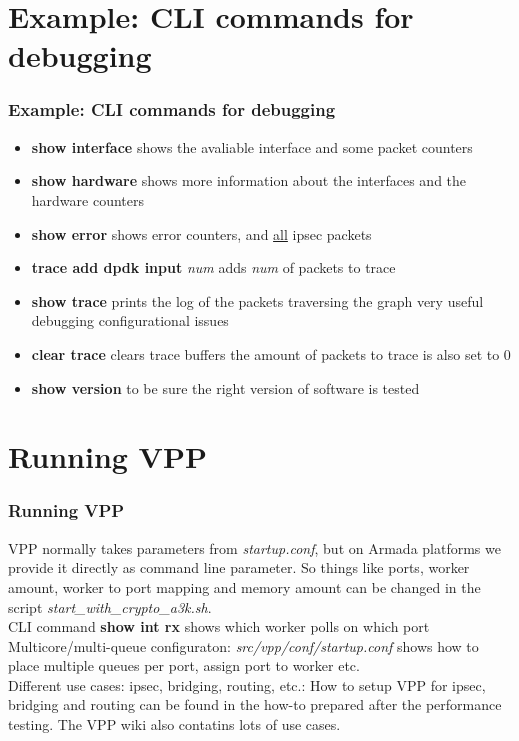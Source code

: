 \documentclass{beamer}
\begin{document}
\section{Example: CLI commands for debugging}
  \begin{frame}
  \frametitle{Example: CLI commands for debugging}
  \begin{itemize}
  \item \textbf{show interface} shows the avaliable interface and some packet counters
  \item \textbf{show hardware} shows more information about the interfaces and the hardware counters
  \item \textbf{show error} shows error counters, and \underline{all} ipsec packets
  \item \textbf{trace add dpdk input} \textit{num} adds \textit{num} of packets to trace
  \item \textbf{show trace} prints the log of the packets traversing the graph 
          {\tiny very useful debugging configurational issues}
  \item \textbf{clear trace} clears trace buffers {\tiny the amount of packets to trace is also set to 0}
  \item \textbf{show version} to be sure the right version of software is tested
  \end{itemize}
  \end{frame}

\section{Running VPP}
  \begin{frame}
  \frametitle{Running VPP}
  VPP normally takes parameters from \textit{startup.conf}, but on Armada platforms we
  provide it directly as command line parameter. So things like
  ports, worker amount, worker to port mapping and memory amount 
  can be changed in the script
  \textit{start\_with\_crypto\_a3k.sh}. \\
  CLI command \textbf{show int rx} shows which worker polls on which port
  \vfill
  {\tiny \color{blue} Multicore/multi-queue configuraton:} {\tiny \color{red} \textit{src/vpp/conf/startup.conf} shows how to place multiple queues per port, assign port to worker etc.} \\
  {\tiny \color{blue} Different use cases: ipsec, bridging, routing, etc.:} {\tiny \color{red} How to setup VPP for ipsec, bridging and routing can be found in the how-to prepared after the performance testing. The VPP wiki also contatins lots of use cases.} \\
  \end{frame}
\end{document}
